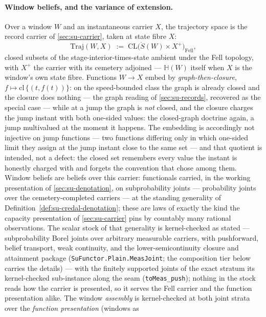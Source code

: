 \paragraph{Window beliefs, and the variance of extension.} Over a
window $W$ and an instantaneous carrier $X$, the trajectory space
is the record carrier of \autoref{sec:su-carrier}, taken at state
fibre $X$:
\[
  \mathrm{Traj}(W, X) \;:=\;
  \mathrm{CL}\bigl(\mathring{S}(W) \times X^{+}\bigr)_{\mathrm{Fell}},
\]
closed subsets of the stage-interior-times-state ambient under the
Fell topology, with $X^{+}$ the carrier with its cemetery adjoined
--- $\mathbb{H}(W)$ itself when $X$ is the window's own state
fibre. Functions $W \to X$ embed by \emph{graph-then-closure},
$f \mapsto \mathrm{cl}\,\{(t, f(t))\}$: on the speed-bounded class
the graph is already closed and the closure does nothing --- the
graph reading of \autoref{sec:su-records}, recovered as the special
case --- while at a jump the graph is \emph{not} closed, and the
closure charges the jump instant with both one-sided values: the
closed-graph doctrine again, a jump multivalued at the moment it
happens. The embedding is accordingly not injective on jump
functions --- two functions differing only in which one-sided limit
they assign at the jump instant close to the same set --- and that
quotient is intended, not a defect: the closed set remembers every
value the instant is honestly charged with and forgets the
convention that chose among them. Window beliefs are beliefs
over this carrier: functionals carried, in the
working presentation of \autoref{sec:su-denotation}, on
subprobability joints ---
probability joints over the cemetery-completed carriers --- at the
standing generality of
Definition~\ref{def:su-credal-denotation}; these are laws of
exactly the kind the capacity presentation of
\autoref{sec:su-carrier} pins by countably many rational
observations. The scalar stock of that
generality is kernel-checked as stated --- subprobability Borel
joints over arbitrary measurable carriers, with pushforward,
belief transport, weak continuity, and the lower-semicontinuity
closure and attainment package
(\texttt{SuFunctor.Plain.MeasJoint}; the composition tier below
carries the details) --- with the finitely supported joints of the
exact stratum its kernel-checked sub-instance along the seam
(\texttt{toMeas\_push}); nothing in the stock reads how the carrier
is presented, so it serves the Fell carrier and the function
presentation alike. The window \emph{assembly} is kernel-checked at
both joint strata over the \emph{function presentation} (windows as
